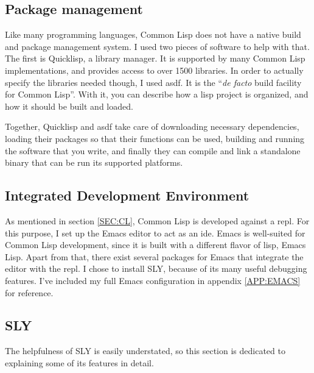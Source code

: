 
\label{SEC:DEV_ENV}

\subsection{Package management}


Like many programming languages,
Common Lisp does not have a native build and package management system.
I used two pieces of software to help with that.
The first is Quicklisp,
a library manager.
It is supported by many Common Lisp implementations,
and provides access to over 1500 libraries.\cite{quicklisp}
In order to actually specify the libraries needed though,
I used \ac{asdf}.
It is the ``\textit{de facto} build facility for Common Lisp''\cite{asdf}.
With it,
you can describe how a lisp project is organized,
and how it should be built and loaded.

Together,
Quicklisp and \ac{asdf} take care of downloading necessary dependencies,
loading their packages so that their functions can be used,
building and running the software that you write,
and finally they can compile and link a standalone binary that can be run its supported platforms.

\subsection{Integrated Development Environment}


As mentioned in section \ref{SEC:CL},
Common Lisp is developed against a \ac{repl}.
For this purpose,
I set up the Emacs editor to act as an \ac{ide}.
Emacs is well-suited for Common Lisp development,
since it is built with a different flavor of lisp,
Emacs Lisp.
Apart from that,
there exist several packages for Emacs that integrate the editor with the \ac{repl}.
I chose to install SLY,
because of its many useful debugging features.
I've included my full Emacs configuration in appendix \ref{APP:EMACS} for reference.

\subsection{SLY}


The helpfulness of SLY is easily understated,
so this section is dedicated to explaining some of its features in detail\cite{sly}.

